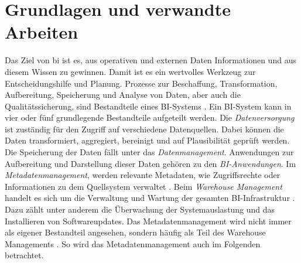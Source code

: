 \chapter{Grundlagen und verwandte Arbeiten}
\label{ch:background}
Das Ziel von \ac{bi} ist es, aus operativen und externen Daten Informationen und aus diesem Wissen zu gewinnen. Damit ist es ein wertvolles Werkzeug zur Entscheidungshilfe und Planung. Prozesse zur Beschaffung, Transformation, Aufbereitung, Speicherung und Analyse von Daten, aber auch die Qualitätssicherung, sind Bestandteile eines BI-Systems \cite{muller_business_2013}. Ein BI-System kann in vier oder fünf grundlegende Bestandteile aufgeteilt werden. Die \textit{Datenversorgung} ist zuständig für den Zugriff auf verschiedene Datenquellen. Dabei können die Daten transformiert, aggregiert, bereinigt und auf Plausibilität geprüft werden. Die Speicherung der Daten fällt unter das \textit{Datenmanagement}. Anwendungen zur Aufbereitung und Darstellung dieser Daten gehören zu den \textit{BI-Anwendungen}. Im \textit{Metadatenmanagement}, werden relevante Metadaten, wie Zugriffsrechte oder Informationen zu dem Quellsystem verwaltet \cite{kemper_bi-glossar_2008}. Beim \textit{Warehouse Management} handelt es sich um die Verwaltung und Wartung der gesamten BI-Infrastruktur \cite{grunwald_business_2009}. Dazu zählt unter anderem die Überwachung der Systemauslastung und das Installieren von Softwareupdates. Das {Metadatenmanagement} wird nicht immer als eigener Bestandteil angesehen, sondern häufig als Teil des {Warehouse Managements} \cite{humm_architektur_2005}. So wird das {Metadatenmanagement} auch im Folgenden betrachtet.


